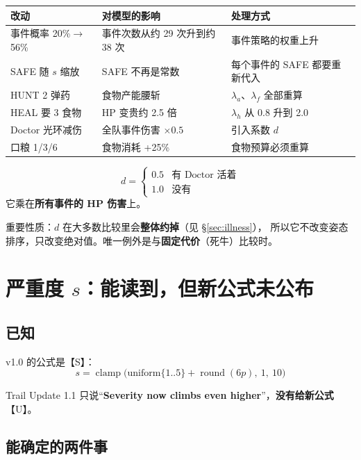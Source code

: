 \documentclass[UTF8,11pt,a4paper]{ctexart}
\begin{document}
\begin{center}
\small
\begin{longtable}{@{}p{4.4cm}p{4.6cm}p{5.6cm}@{}}
\toprule
\textbf{改动} & \textbf{对模型的影响} & \textbf{处理方式} \\
\midrule
\endhead
事件概率 20\%$\to$56\% & 事件次数从约 29 次升到约 38 次 & 事件策略的权重上升 \\
SAFE 随 $s$ 缩放 & SAFE 不再是常数 & 每个事件的 SAFE 都要重新代入 \\
HUNT 2 弹药 & 食物产能腰斩 & $\lambda_a$、$\lambda_f$ 全部重算 \\
HEAL 要 3 食物 & HP 变贵约 2.5 倍 & $\lambda_h$ 从 0.8 升到 2.0 \\
Doctor 光环减伤 & 全队事件伤害 $\times 0.5$ & 引入系数 $d$ \\
口粮 1/3/6 & 食物消耗 +25\% & 食物预算必须重算 \\
\bottomrule
\end{longtable}
\end{center}

\begin{keybox}[title={引入 Doctor 系数 $d$}]
\[
d=\begin{cases}0.5 & \text{有 Doctor 活着}\\ 1.0 & \text{没有}\end{cases}
\]
它乘在\textbf{所有事件的 HP 伤害}上。

重要性质：$d$ 在大多数比较里会\textbf{整体约掉}（见 \S\ref{sec:illness}），
所以它不改变姿态排序，只改变绝对值。唯一例外是与\textbf{固定代价}（死牛）比较时。
\end{keybox}

\section{严重度 $s$：能读到，但新公式未公布}

\subsection{已知}

v1.0 的公式是【S】：
\[
s=\operatorname{clamp}\Big(\text{uniform}\{1..5\}+\operatorname{round}(6p),\ 1,\ 10\Big)
\]

Trail Update 1.1 只说“\textbf{Severity now climbs even higher}”，\textbf{没有给新公式}【U】。

\subsection{能确定的两件事}
\end{document}
